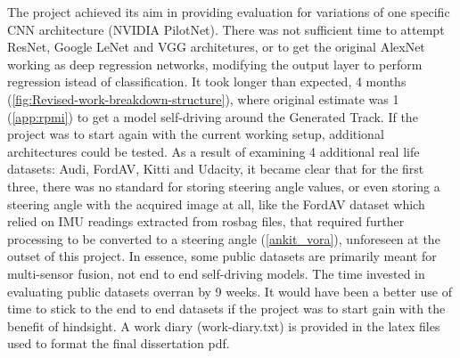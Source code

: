 The project achieved its aim in providing evaluation for variations of one specific CNN architecture (NVIDIA PilotNet). There was not sufficient time to attempt ResNet, Google LeNet and VGG architetures, or to get the original AlexNet working as deep regression networks, modifying the output layer to perform regression istead of classification. It took longer than expected, 4 months (\ref{fig:Revised-work-breakdown-structure}), where original estimate was 1 (\ref{app:rpmi}) to get a model self-driving around the Generated Track. If the project was to start again with the current working setup, additional architectures could be tested. As a result of examining 4 additional real life datasets: Audi, FordAV, Kitti and Udacity, it became clear that for the first three, there was no standard for storing steering angle values, or even storing a steering angle with the acquired image at all, like the FordAV dataset which relied on IMU readings extracted from rosbag files, that required further processing to be converted to a steering angle (\ref{ankit_vora}), unforeseen at the outset of this project. In essence, some public datasets are primarily meant for multi-sensor fusion, not end to end self-driving models. The time invested in evaluating public datasets overran by 9 weeks. It would have been a better use of time to stick to the end to end datasets if the project was to start gain with the benefit of hindsight. A work diary (work-diary.txt) is provided in the latex files used to format the final dissertation pdf.

  

